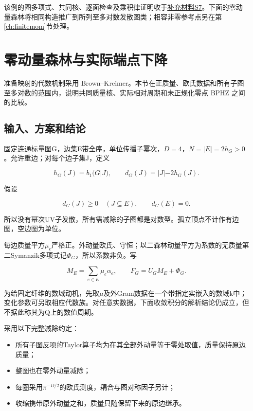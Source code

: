 \documentclass[11pt,a4paper,oneside]{ctexart}
\theoremstyle{cnplain}
\theoremstyle{definition}
\theoremstyle{remark}
\newcommand{\tightlist}{\setlength{\itemsep}{0pt}\setlength{\parskip}{0pt}}
\numberwithin{equation}{section}
\newcommand{\otherref}[2]{\href{#1.pdf}{#2}}
\begin{document}
该例的图多项式、共同核、逐面检查及乘积律证明收于\otherref{feynman_periods_supplement}{补充材料S7}。下面的零动量森林将相同构造推广到所列至多对数发散图类；相容非零参考点另在第\ref{ch:finitemom}节处理。

\section{零动量森林与实际端点下降}\label{ch:zero}\label{ch:descent}

\begingroup

准备映射的代数机制采用 Brown--Kreimer\cite{bk2011}。本节在正质量、欧氏数据和所有子图至多对数的范围内，说明共同质量核、实际相对周期和未正规化零点 BPHZ 之间的比较。

\subsection{输入、方案和结论}\label{sec:zero:1}

固定连通标量图G，边集E带全序，单位传播子幂次，\(D=4\)，\(N=|E|=2h_G>0\)。允许重边；对每个边子集J，定义

\begin{equation}
h_G(J)=b_1(G|J),\qquad d_G(J)=|J|-2h_G(J).
\end{equation}

假设

\begin{equation}
d_G(J)\geq0\quad(J\subseteq E),\qquad d_G(E)=0.       \label{eq:zero:1}
\end{equation}

所以没有幂次UV子发散，所有需减除的子图都是对数型。孤立顶点不计作有边图，空边图为单位。

每边质量平方\(\mu _e\)严格正。外动量欧氏、守恒；以二森林动量平方为系数的无质量第二Symanzik多项式记\(\Phi _G\)，所以系数非负。写

\begin{equation}
M_E=\sum_{e\in E}\mu_e\alpha_e,\qquad F_G=U_GM_E+\Phi_G.
\end{equation}

为给固定纤维的数域动机，先取\(\mu \)及外Gram数据在一个带指定实嵌入的数域k中；变化参数可另取相应代数族。对任意实数据，下面收敛积分的解析结论仍成立，但不据此称其为Q上的数值周期。

采用以下完整减除约定：

\begin{itemize}
\tightlist
\item
  所有子图反项的Taylor算子均为在其全部外动量等于零处取值，质量保持原边质量；
\item
  整图也在零外动量减除；
\item
  每圈采用\(\pi ^{-D/2}\)的欧氏测度，耦合与图对称因子另计；
\item
  收缩携带原外动量之和，质量只随保留下来的原边继承。
\end{itemize}
\end{document}
